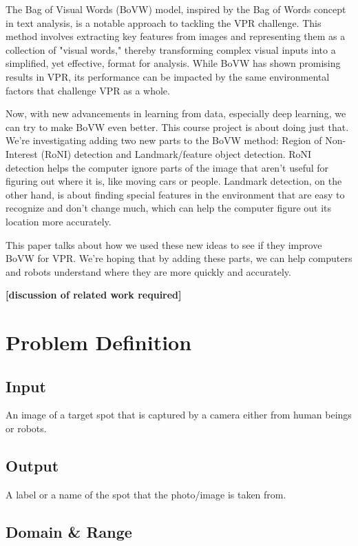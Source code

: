 \documentclass[conference]{IEEEtran}
\begin{document}
The Bag of Visual Words (BoVW) model, inspired by the Bag of Words concept in text analysis, is a notable approach to tackling the VPR challenge. This method involves extracting key features from images and representing them as a collection of "visual words," thereby transforming complex visual inputs into a simplified, yet effective, format for analysis. While BoVW has shown promising results in VPR, its performance can be impacted by the same environmental factors that challenge VPR as a whole.

Now, with new advancements in learning from data, especially deep learning, we can try to make BoVW even better. This course project is about doing just that. We're investigating adding two new parts to the BoVW method: Region of Non-Interest (RoNI) detection and Landmark/feature object detection. RoNI detection helps the computer ignore parts of the image that aren't useful for figuring out where it is, like moving cars or people. Landmark detection, on the other hand, is about finding special features in the environment that are easy to recognize and don't change much, which can help the computer figure out its location more accurately.

This paper talks about how we used these new ideas to see if they improve BoVW for VPR. We're hoping that by adding these parts, we can help computers and robots understand where they are more quickly and accurately.


\textbf{[discussion of related work required]}

\section{Problem Definition}

\subsection{Input}

An image of a target spot that is captured by a camera either from human beings or robots.

\subsection{Output}

A label or a name of the spot that the photo/image is taken from.

\subsection{Domain \& Range}
\end{document}
